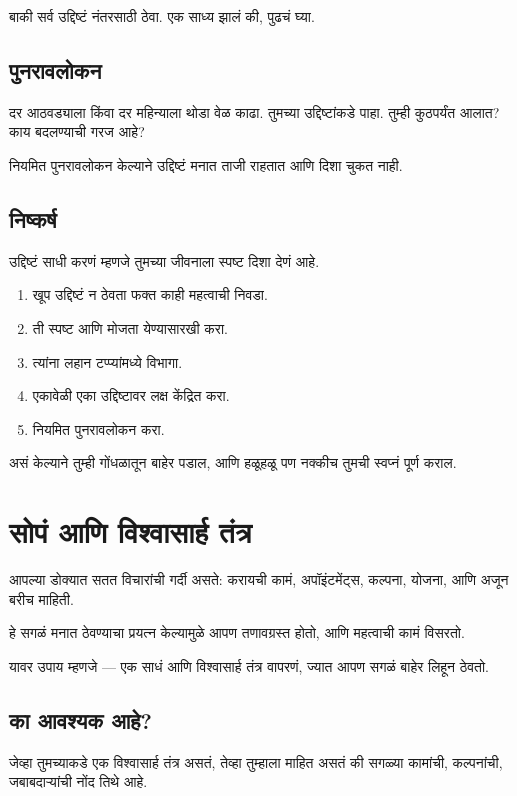 बाकी सर्व उद्दिष्टं नंतरसाठी ठेवा.  
एक साध्य झालं की, पुढचं घ्या.  

\section*{पुनरावलोकन}
दर आठवड्याला किंवा दर महिन्याला थोडा वेळ काढा.  
तुमच्या उद्दिष्टांकडे पाहा.  
तुम्ही कुठपर्यंत आलात?  
काय बदलण्याची गरज आहे?  

नियमित पुनरावलोकन केल्याने  
उद्दिष्टं मनात ताजी राहतात  
आणि दिशा चुकत नाही.  

\section*{निष्कर्ष}
उद्दिष्टं साधी करणं म्हणजे  
तुमच्या जीवनाला स्पष्ट दिशा देणं आहे.  

\begin{enumerate}
\item खूप उद्दिष्टं न ठेवता फक्त काही महत्वाची निवडा.  
\item ती स्पष्ट आणि मोजता येण्यासारखी करा.  
\item त्यांना लहान टप्प्यांमध्ये विभागा.  
\item एकावेळी एका उद्दिष्टावर लक्ष केंद्रित करा.  
\item नियमित पुनरावलोकन करा.  
\end{enumerate}

असं केल्याने तुम्ही गोंधळातून बाहेर पडाल,  
आणि हळूहळू पण नक्कीच तुमची स्वप्नं पूर्ण कराल.  


\chapter{सोपं आणि विश्वासार्ह तंत्र}

आपल्या डोक्यात सतत विचारांची गर्दी असते:  
करायची कामं, अपॉइंटमेंट्स, कल्पना, योजना,  
आणि अजून बरीच माहिती.  

हे सगळं मनात ठेवण्याचा प्रयत्न केल्यामुळे  
आपण तणावग्रस्त होतो,  
आणि महत्वाची कामं विसरतो.  

यावर उपाय म्हणजे —  
एक साधं आणि विश्वासार्ह तंत्र वापरणं,  
ज्यात आपण सगळं बाहेर लिहून ठेवतो.  

\section*{का आवश्यक आहे?}
जेव्हा तुमच्याकडे एक विश्वासार्ह तंत्र असतं,  
तेव्हा तुम्हाला माहित असतं की  
सगळ्या कामांची, कल्पनांची, जबाबदाऱ्यांची नोंद तिथे आहे.  

